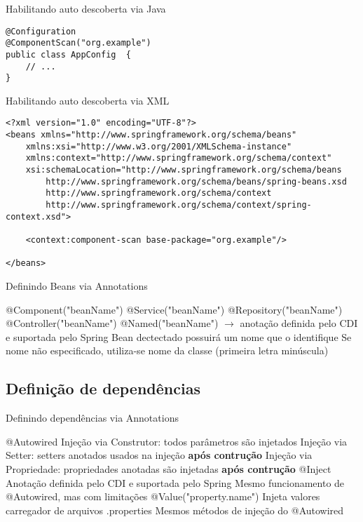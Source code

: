 \documentclass{beamer}
\begin{document}
\begin{frame}[fragile]{Habilitando auto descoberta via Java}
 \begin{verbatim}
@Configuration
@ComponentScan("org.example")
public class AppConfig  {
    // ...
}
  \end{verbatim}
\end{frame}

\begin{frame}[fragile]{Habilitando auto descoberta via XML}
 \begin{verbatim}
<?xml version="1.0" encoding="UTF-8"?>
<beans xmlns="http://www.springframework.org/schema/beans"
    xmlns:xsi="http://www.w3.org/2001/XMLSchema-instance"
    xmlns:context="http://www.springframework.org/schema/context"
    xsi:schemaLocation="http://www.springframework.org/schema/beans
        http://www.springframework.org/schema/beans/spring-beans.xsd
        http://www.springframework.org/schema/context
        http://www.springframework.org/schema/context/spring-context.xsd">

    <context:component-scan base-package="org.example"/>

</beans>
  \end{verbatim}
\end{frame}

\begin{frame}{Definindo Beans via Annotations}
 \begin{outline}
   \alert{@Component("beanName")}
     \alert{@Service("beanName")}
     \alert{@Repository("beanName")}
     \alert{@Controller("beanName")}
   \alert{@Named("beanName")} $\rightarrow$ anotação definida pelo CDI e suportada pelo Spring
   Bean dectectado possuirá um nome que o identifique
   Se nome não especificado, utiliza-se nome da classe (primeira letra minúscula)
 \end{outline}
\end{frame}

\subsection{Definição de dependências}

\begin{frame}{Definindo dependências via Annotations}
 \begin{outline}
   \alert{@Autowired}
     Injeção via Construtor: todos parâmetros são injetados
     Injeção via Setter: setters anotados usados na injeção \textbf{após contrução}
     Injeção via Propriedade: propriedades anotadas são injetadas \textbf{após contrução}
   \alert{@Inject}
     Anotação definida pelo CDI e suportada pelo Spring
     Mesmo funcionamento de \alert{@Autowired}, mas com limitações
   \alert{@Value("property.name")}
     Injeta valores carregador de arquivos .properties
     Mesmos métodos de injeção do \alert{@Autowired}
 \end{outline}
\end{frame}
\end{document}

